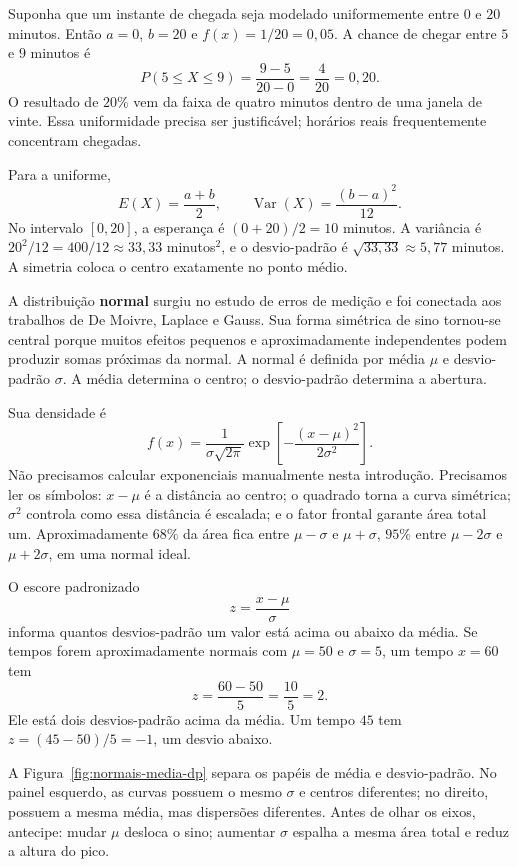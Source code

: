 Suponha que um instante de chegada seja modelado uniformemente entre $0$ e $20$ minutos. Então $a=0$, $b=20$ e $f(x)=1/20=0{,}05$. A chance de chegar entre $5$ e $9$ minutos é
\[
P(5\leq X\leq9)=\frac{9-5}{20-0}=\frac4{20}=0{,}20.
\]
O resultado de $20\%$ vem da faixa de quatro minutos dentro de uma janela de vinte. Essa uniformidade precisa ser justificável; horários reais frequentemente concentram chegadas.

Para a uniforme,
\[
E(X)=\frac{a+b}{2},
\qquad
\operatorname{Var}(X)=\frac{(b-a)^2}{12}.
\]
No intervalo $[0,20]$, a esperança é $(0+20)/2=10$ minutos. A variância é $20^2/12=400/12\approx33{,}33$ minutos$^2$, e o desvio-padrão é $\sqrt{33{,}33}\approx5{,}77$ minutos. A simetria coloca o centro exatamente no ponto médio.

A distribuição \textbf{normal} surgiu no estudo de erros de medição e foi conectada aos trabalhos de De Moivre, Laplace e Gauss. Sua forma simétrica de sino tornou-se central porque muitos efeitos pequenos e aproximadamente independentes podem produzir somas próximas da normal. A normal é definida por média $\mu$ e desvio-padrão $\sigma$. A média determina o centro; o desvio-padrão determina a abertura.

Sua densidade é
\[
f(x)=\frac{1}{\sigma\sqrt{2\pi}}
\exp\left[-\frac{(x-\mu)^2}{2\sigma^2}\right].
\]
Não precisamos calcular exponenciais manualmente nesta introdução. Precisamos ler os símbolos: $x-\mu$ é a distância ao centro; o quadrado torna a curva simétrica; $\sigma^2$ controla como essa distância é escalada; e o fator frontal garante área total um. Aproximadamente $68\%$ da área fica entre $\mu-\sigma$ e $\mu+\sigma$, $95\%$ entre $\mu-2\sigma$ e $\mu+2\sigma$, em uma normal ideal.

O escore padronizado
\[
z=\frac{x-\mu}{\sigma}
\]
informa quantos desvios-padrão um valor está acima ou abaixo da média. Se tempos forem aproximadamente normais com $\mu=50$ e $\sigma=5$, um tempo $x=60$ tem
\[
z=\frac{60-50}{5}=\frac{10}{5}=2.
\]
Ele está dois desvios-padrão acima da média. Um tempo $45$ tem $z=(45-50)/5=-1$, um desvio abaixo.

A Figura~\ref{fig:normais-media-dp} separa os papéis de média e desvio-padrão. No painel esquerdo, as curvas possuem o mesmo $\sigma$ e centros diferentes; no direito, possuem a mesma média, mas dispersões diferentes. Antes de olhar os eixos, antecipe: mudar $\mu$ desloca o sino; aumentar $\sigma$ espalha a mesma área total e reduz a altura do pico.

